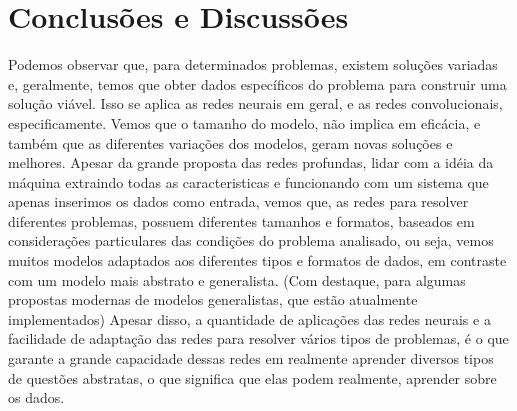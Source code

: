 \documentclass[conference]{IEEEtran}
\begin{document}
\section{Conclusões e Discussões}
Podemos observar que, para determinados problemas, existem soluções variadas e, geralmente, temos que obter dados específicos do problema para construir uma solução viável. Isso se aplica as redes neurais em geral, e as redes convolucionais, especificamente. Vemos que o tamanho do modelo, não implica em eficácia, e também que as diferentes variações dos modelos, geram novas soluções e melhores. Apesar da grande proposta das redes profundas, lidar com a idéia da máquina extraindo todas as caracteristicas e funcionando com um sistema que apenas inserimos os dados como entrada, vemos que, as redes para resolver diferentes problemas, possuem diferentes tamanhos e formatos, baseados em considerações particulares das condições do problema analisado, ou seja, vemos muitos modelos adaptados aos diferentes tipos e formatos de dados, em contraste com um modelo mais abstrato e generalista. (Com destaque, para algumas propostas modernas de modelos generalistas, que estão atualmente implementados) Apesar disso, a quantidade de aplicações das redes neurais e a facilidade de adaptação das redes para resolver vários tipos de problemas, é o que garante a grande capacidade dessas redes em realmente aprender diversos tipos de questões abstratas, o que significa que elas podem realmente, aprender sobre os dados.


\nocite{*}

\end{document}
